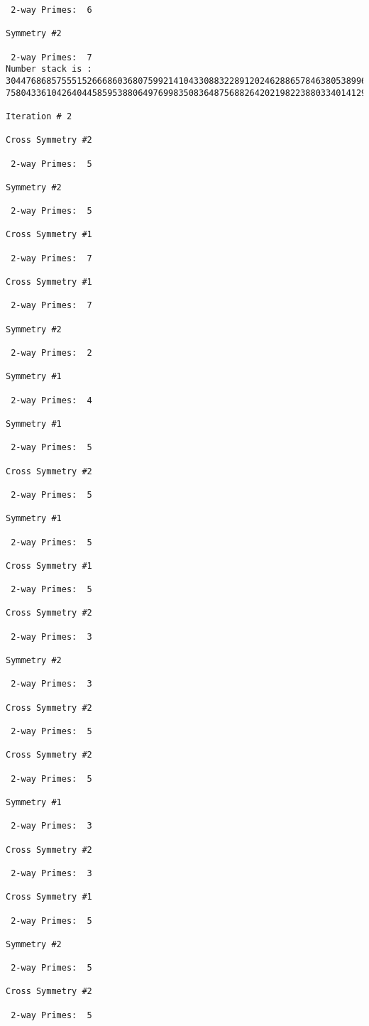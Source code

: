 {{{{\begin{verbatim}
 2-way Primes: 	6

Symmetry #2

 2-way Primes: 	7
Number stack is :
30447686857555152666860368075992141043308832289120246288657846380538996794608835958544046240163340857
75804336104264044585953880649769983508364875688264202198223880334014129957086306866625155575868674403

Iteration #	2

Cross Symmetry #2

 2-way Primes: 	5

Symmetry #2

 2-way Primes: 	5

Cross Symmetry #1

 2-way Primes: 	7

Cross Symmetry #1

 2-way Primes: 	7

Symmetry #2

 2-way Primes: 	2

Symmetry #1

 2-way Primes: 	4

Symmetry #1

 2-way Primes: 	5

Cross Symmetry #2

 2-way Primes: 	5

Symmetry #1

 2-way Primes: 	5

Cross Symmetry #1

 2-way Primes: 	5

Cross Symmetry #2

 2-way Primes: 	3

Symmetry #2

 2-way Primes: 	3

Cross Symmetry #2

 2-way Primes: 	5

Cross Symmetry #2

 2-way Primes: 	5

Symmetry #1

 2-way Primes: 	3

Cross Symmetry #2

 2-way Primes: 	3

Cross Symmetry #1

 2-way Primes: 	5

Symmetry #2

 2-way Primes: 	5

Cross Symmetry #2

 2-way Primes: 	5


\end{verbatim}}}}}

